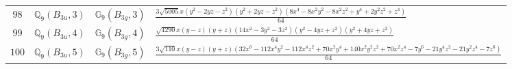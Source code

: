 \documentclass[fleqn,8pt,landscape]{jsarticle}
\begin{document}
\begin{table}[ht!]
\begin{center}
\begin{tabular}{cccl}
$ 98 $ & $ \mathbb{Q}_{9}(B_{3u},3) $ & $ \mathbb{G}_{9}(B_{3g},3) $ & $ \frac{3 \sqrt{5005} x \left(y^{2} - 2 y z - z^{2}\right) \left(y^{2} + 2 y z - z^{2}\right) \left(8 x^{4} - 8 x^{2} y^{2} - 8 x^{2} z^{2} + y^{4} + 2 y^{2} z^{2} + z^{4}\right)}{64} $ \\
$ 99 $ & $ \mathbb{Q}_{9}(B_{3u},4) $ & $ \mathbb{G}_{9}(B_{3g},4) $ & $ \frac{\sqrt{4290} x \left(y - z\right) \left(y + z\right) \left(14 x^{2} - 3 y^{2} - 3 z^{2}\right) \left(y^{2} - 4 y z + z^{2}\right) \left(y^{2} + 4 y z + z^{2}\right)}{64} $ \\
$ 100 $ & $ \mathbb{Q}_{9}(B_{3u},5) $ & $ \mathbb{G}_{9}(B_{3g},5) $ & $ \frac{3 \sqrt{110} x \left(y - z\right) \left(y + z\right) \left(32 x^{6} - 112 x^{4} y^{2} - 112 x^{4} z^{2} + 70 x^{2} y^{4} + 140 x^{2} y^{2} z^{2} + 70 x^{2} z^{4} - 7 y^{6} - 21 y^{4} z^{2} - 21 y^{2} z^{4} - 7 z^{6}\right)}{64} $ \\
 \hline \hline
\end{tabular}
\end{center}
\end{table}
\end{document}
